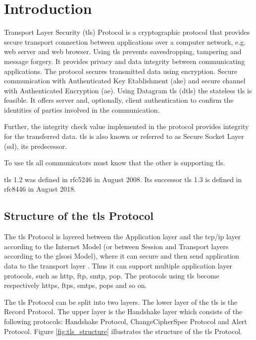 \chapter{Introduction}
\label{chap:introduction}

Transport Layer Security (\gls{tls}) Protocol is a cryptographic protocol that provides secure transport connection between applications over a computer network, e.g. web server and web browser. 
Using \gls{tls} prevents eavesdropping, tampering and message forgery. It provides privacy and data integrity between communicating applications. The protocol secures transmitted data using encryption. Secure communication with Authenticated Key Etablishment (\gls{ake}) and secure channel with Authenticated Encryption (\gls{ae}). 
Using Datagram \gls{tls} (\gls{dtls}) the stateless \gls{tls} is feasible. It offers server and, optionally, client authentication to confirm the identities of parties involved in the communication. 
 
Further, the integrity check value implemented in the protocol provides integrity for the transferred data. \gls{tls} is also known or referred to as Secure Socket Layer (\gls{ssl}), its predecessor. 
 
To use \gls{tls} all communicators must know that the other is supporting \gls{tls}.

\gls{tls} 1.2 was defined in \gls{rfc}5246 in August 2008. Its successor \gls{tls} 1.3 is defined in \gls{rfc}8446 in August 2018.
 \cite{RFC5246}\cite{ms:overview}

\section{Structure of the \gls{tls} Protocol}
\label{sec:stucture}

The \gls{tls} Protocol is layered between the Application layer and the \gls{tcp}/\gls{ip} layer according to the Internet Model (or between Session and Transport layers according to the gls{osi} Model), where it can secure and then send application data to the transport layer \cite{ms:overview}. Thus it can support multiple application layer protocols, such as \gls{http}, \gls{ftp}, \gls{smtp}, \gls{pop}. The protocols using \gls{tls} become respectively \gls{https}, \gls{ftps}, \gls{smtps}, \gls{pops} and so on.

The \gls{tls} Protocol can be split into two layers. The lower layer of the \gls{tls} is the Record Protocol. The upper layer is the Handshake layer which consists of the following protocols: Handshake Protocol, ChangeCipherSpec Protocol and Alert Protocol. Figure \ref{fig:tls_structure} illustrates the structure of the \gls{tls} Protocol. 
\cite{tlsstrukt}

